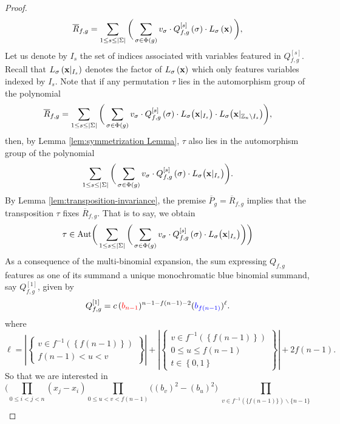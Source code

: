 \begin{proof}
\[
\overline{R}_{f,g}=\sum_{1\leq s\leq\left|\Sigma\right|}\bigg(\sum_{\sigma\in\Phi(g)}v_{\sigma}\cdot Q_{f,g}^{\left[s\right]}\left(\sigma\right)\cdot L_{\sigma}\left({\bf x}\right)\bigg),
\]
Let us denote by $I_s$ the set of indices associated with variables featured in $Q_{f,g}^{\left[s\right]}$. Recall that  $L_{\sigma}\left({\bf x}|_{I_{s}}\right)$ denotes the factor of $L_{\sigma}\left({\bf x}\right)$ which only features variables indexed by $I_s$. Note that if any permutation $\tau$ lies in the automorphism group of the polynomial
\[
\overline{R}_{f,g}=\sum_{1\leq s\leq\left|\Sigma\right|}\bigg(\sum_{\sigma\in\Phi(g)}v_{\sigma}\cdot Q_{f,g}^{\left[s\right]}\left(\sigma\right)\cdot L_{\sigma}\big({\bf x}|_{I_{s}}\big)\cdot L_{\sigma}\big({\bf x}|_{\mathbb{Z}_{n}\setminus I_{s}}\big)\bigg),
\]
then, by Lemma \ref{lem:symmetrization Lemma}, $\tau$ also lies in the automorphism group of the polynomial
\[
\sum_{1\leq s\leq\left|\Sigma\right|}\bigg(\sum_{\sigma\in\Phi(g)}v_{\sigma}\cdot Q_{f,g}^{\left[s\right]}\left(\sigma\right)\cdot L_{\sigma}\big({\bf x}|_{I_{s}}\big)\bigg).
\]
By Lemma \ref{lem:transposition-invariance}, the premise $\overline{P}_{g}=\overline{R}_{f,g}$
implies that the transposition $\tau$ fixes $\overline{R}_{f,g}$. That is to say, we obtain
\[
\tau \in \text{Aut}\bigg(\sum_{1\leq s\leq\left|\Sigma\right|}\bigg(\sum_{\sigma\in\Phi(g)}v_{\sigma}\cdot Q_{f,g}^{\left[s\right]}\left(\sigma\right)\cdot L_{\sigma}\big({\bf x}|_{I_{s}}\big)\bigg)
 \bigg)
\]
As a consequence of the multi-binomial expansion, the sum expressing
$Q_{f,g}$ features as one of its summand a unique monochromatic blue binomial summand, say $Q_{f,g}^{\left[1\right]}$, given by
\[
Q_{f,g}^{\left[1\right]}=c\,({\color{red}b_{n-1}})^{n-1-f(n-1)-2}({\color{blue}b_{f\left(n-1\right)}})^{\ell}.
\]
where
\[
\ell=\left|\left\{ \begin{array}{c}
v\in f^{-1}\left(\left\{ f\left(n-1\right)\right\} \right)\\
f\left(n-1\right)<u<v
\end{array}\right\} \right|+\left|\left\{ \begin{array}{c}
v\in f^{-1}\left(\left\{ f\left(n-1\right)\right\} \right)\\
0\le u\le f\left(n-1\right)\\
t\in\left\{ 0,1\right\} 
\end{array}\right\} \right|+2f(n-1).
\]
So that we are interested in
\[
\bigg(\prod_{0\leq i<j<n}(x_{j}-x_{i})\prod_{0\leq u<v<f(n-1)}\big((b_{v})^{2}-(b_{u})^{2}\big)\prod_{\substack{v\in f^{-1}(\{f(n-1)\})\backslash\{n-1\}\\
}}\]
\end{proof}
